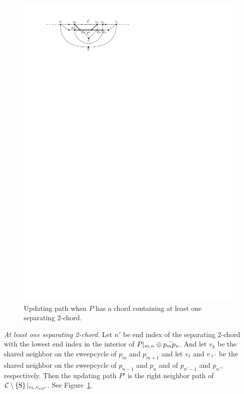 \begin{figure}[!b]
        \includegraphics[scale=1]{unifiedAlgo/img/sweep/cases/2chordInChordUpdate}
        \caption{Updating path when $P$ has a chord containing at least one separating 2-chord.}
        \label{fig:sweep:2chordInChordUpdate}
      \end{figure}

    \emph{At least one separating 2-chord.}
      Let $n'$ be end index of the separating 2-chord with the lowest end index in the interior of $P|_{m, n} \oplus \accentset{\leftharpoonup}{p_m p_n}$. And let $v_k$ be the shared neighbor on the sweepcycle of $p_{m}$ and $p_{m +1}$ and let $v_\ell$ and $v_{\ell'}$ be the shared neighbor on the sweepcycle  of $p_{n -1}$ and $p_{n}$ and of $p_{n' -1}$ and $p_{n'}$, respectively.
      Then the updating path $P'$ is the right neighbor path of $\mathcal{C} \setminus \left\lbrace {\mathrm{S}} \right\rbrace|_{v_k, v_{ell'}}$. See Figure~\ref{fig:sweep:2chordInChordUpdate}.

